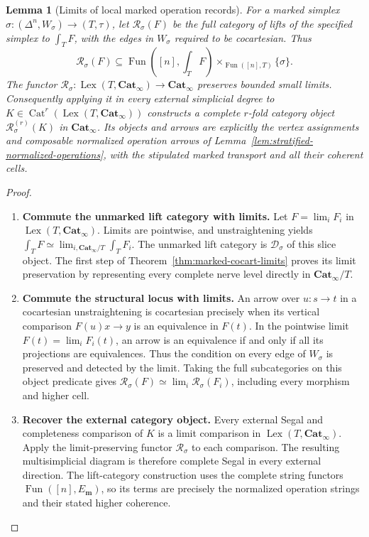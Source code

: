 \documentclass[oneside]{article}
\theoremstyle{plain}
\newtheorem{lemma}[theorem]{Lemma}
\theoremstyle{definition}
\theoremstyle{remark}
\newcommand{\Cat}{\mathbf{Cat}_{\infty}}
\newcommand{\Fun}{\operatorname{Fun}}
\newcommand{\Lex}{\operatorname{Lex}}
\begin{document}
\begin{lemma}[Limits of local marked operation records]
\label{lem:stratified-local-operation-limits}
For a marked simplex $\sigma:(\Delta^n,W_\sigma)\to(T,\tau)$,
let $\mathscr R_\sigma(F)$ be the full category of lifts of the
specified simplex to $\int_TF$, with the edges in $W_\sigma$
required to be cocartesian.  Thus
\[
 \mathscr R_\sigma(F)\subseteq
 \Fun([n],\textstyle\int_TF)
 \times_{\Fun([n],T)}\{\sigma\}.
\]
The functor $\mathscr R_\sigma:\Lex(T,\Cat)\to\Cat$ preserves
bounded small limits.  Consequently applying it in every external
simplicial degree to $K\in\operatorname{Cat}^r(\Lex(T,\Cat))$
constructs a complete $r$-fold category object
$\mathscr R^{(r)}_\sigma(K)$ in $\Cat$.  Its objects and arrows
are explicitly the vertex assignments and composable normalized
operation arrows of Lemma~\ref{lem:stratified-normalized-operations},
with the stipulated marked transport and all their coherent cells.
\end{lemma}
\begin{proof}
\leavevmode
\begin{enumerate}
\item \textbf{Commute the unmarked lift category with limits.}
Let $F=\lim_iF_i$ in $\Lex(T,\Cat)$.  Limits are pointwise,
and unstraightening yields
$\int_TF\simeq\lim_{i,\Cat/T}\int_TF_i$.
The unmarked lift category is $\mathcal D_\sigma$ of this slice
object. The first step of Theorem~\ref{thm:marked-cocart-limits}
proves its limit preservation by representing every complete nerve
level directly in $\Cat/T$.
\item \textbf{Commute the structural locus with limits.}
An arrow over $u:s\to t$ in a cocartesian unstraightening is
cocartesian precisely when its vertical comparison
$F(u)x\to y$ is an equivalence in $F(t)$.  In the pointwise
limit $F(t)=\lim_iF_i(t)$, an arrow is an equivalence if and only
if all its projections are equivalences.  Thus the condition on
every edge of $W_\sigma$ is preserved and detected by the limit.
Taking the full subcategories on this object predicate gives
$\mathscr R_\sigma(F)\simeq\lim_i\mathscr R_\sigma(F_i)$,
including every morphism and higher cell.
\item \textbf{Recover the external category object.}
Every external Segal and completeness comparison of $K$ is a limit
comparison in $\Lex(T,\Cat)$.  Apply the limit-preserving functor
$\mathscr R_\sigma$ to each comparison.  The resulting
multisimplicial diagram is therefore complete Segal in every external
direction.  The lift-category construction uses the complete string
functors $\Fun([n],E_{\mathbf m})$, so its terms are precisely the
normalized operation strings and their stated higher coherence.
\qedhere
\end{enumerate}
\end{proof}
\end{document}
